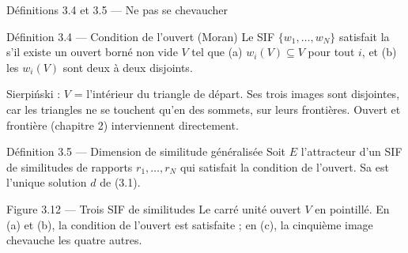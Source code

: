 \begin{frame}{Définitions 3.4 et 3.5 --- Ne pas se chevaucher}
  \begin{Enonce}{Définition 3.4 --- Condition de l'ouvert (Moran)}
    \small Le SIF $\{w_1,\dots,w_N\}$ satisfait la  s'il existe un ouvert borné non vide $V$ tel que
    (a) $w_i(V)\subseteq V$ pour tout $i$, et (b) les $w_i(V)$ sont deux
    à deux disjoints.
  \end{Enonce}
  \small Sierpiński : $V$ = l'intérieur du triangle de départ. Ses trois
  images sont disjointes, car les triangles ne se touchent qu'en des
  sommets, sur leurs frontières. Ouvert et frontière (chapitre 2)
  interviennent directement.
  \begin{Enonce}{Définition 3.5 --- Dimension de similitude généralisée}
    \small Soit $E$ l'attracteur d'un SIF de similitudes de rapports
    $r_1,\dots,r_N$ qui satisfait la condition de l'ouvert. Sa
     est l'unique solution
    $d$ de (3.1).
  \end{Enonce}
\end{frame}

\begin{frame}{Figure 3.12 --- Trois SIF de similitudes}
  \small Le carré unité ouvert $V$ en pointillé. En (a) et (b), la
  condition de l'ouvert est satisfaite ; en (c), la cinquième image
  chevauche les quatre autres.
\end{frame}

